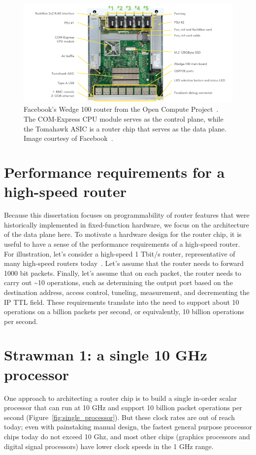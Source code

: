 \begin{figure}
\centering
\includegraphics[width=\textwidth]{wedge100.png}
\caption{Facebook's Wedge 100 router from the Open Compute Project~\cite{ocp}.
The COM-Express CPU module serves as the control plane, while the Tomahawk ASIC
is a router chip that serves as the data plane. Image courtesy of
Facebook~\cite{wedge100}.}
\label{fig:router_box}
\end{figure}

\section{Performance requirements for a high-speed router}
Because this dissertation focuses on programmability of router features that
were historically implemented in fixed-function hardware, we focus on the
architecture of the data plane here. To motivate a hardware design for the
router chip, it is useful to have a sense of the performance requirements of a
high-speed router. For illustration, let's consider a high-speed 1 Tbit/s
router, representative of many high-speed routers today~\cite{trident2,
tomahawk, tomahawk2}. Let's assume that the router needs to forward 1000 bit
packets. Finally, let's assume that on each packet, the router needs to carry
out \textasciitilde10 operations, such as determining the output port based on
the destination address, access control, tuneling, measurement, and
decrementing the IP TTL field. These requirements translate into the need to
support about 10 operations on a billion packets per second, or equivalently, 10
billion operations per second.

\section{Strawman 1: a single 10 GHz processor}
One approach to architecting a router chip is to build a single in-order scalar
processor that can run at 10 GHz and support 10 billion packet operations per
second (Figure~\ref{fig:single_processor}). But these clock rates are out of
reach today; even with painstaking manual design, the fastest general purpose
processor chips today do not exceed 10 Ghz, and most other chips (\eg graphics
processors and digital signal processors) have lower clock speeds in the 1 GHz
range.

